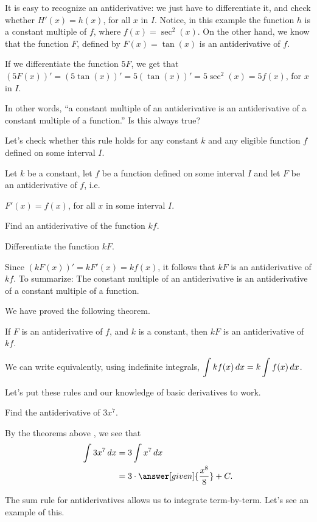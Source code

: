 \documentclass{ximera}
\begin{document}
It is easy to recognize an antiderivative: we just have to differentiate it, and check whether $H'(x)=h(x)$, for all $x$ in $I$.
Notice, in this example the function $h$ is a constant multiple of $f$, 
where $f(x)=\sec^{2}(x)$. On the other hand, we know that the function $F$, defined by
$F(x)=\tan(x)$ is an antiderivative of $f$.

If we  differentiate the function $5F$, we get that
$\left(5F(x)\right)'=\left(5\tan(x)\right)'=5\left(\tan(x)\right)'=5\sec^2(x)=5f(x)$, for $x$ in $I$.
  
  In other words, ``a constant multiple of an antiderivative is an antiderivative of a constant multiple of a function.''
Is this always true?

Let's check whether this rule holds for  any constant $k$ and any eligible  function $f$ defined on some interval $I$.

\begin{question}
Let $k$ be a constant, let $f$ be a function defined on some interval $I$ and let $F$ be an antiderivative of $f$, i.e.

$F'(x)=f(x)$, for all  $x$ in some interval $I$.

  Find an antiderivative of the function $k f$.
    \begin{hint}
    Differentiate the function $kF$.
     \end{hint}
     Since $\left(kF(x)\right)'=kF'(x)=kf(x)$, it follows that $kF$ is
     an antiderivative of $kf$.
 To summarize: The constant multiple of an antiderivative is an antiderivative of a constant multiple of a function. 
\end{question}
We have proved the following theorem.
\begin{theorem}\label{theorem:CMRA}
	If $F$ is an antiderivative of $f$, and $k$ is a constant, then $kF$ is an antiderivative of $kf$.

	We can write equivalently, using indefinite integrals,  $\displaystyle \int kf(x) \,d x= k\int f(x)\,d x$.
\end{theorem}
Let's put these rules and our knowledge of basic derivatives to work.
\begin{example}
Find the antiderivative of $3 x^7$.
\begin{explanation}
By the theorems above , we see that
\begin{align*}
\int 3 x^7 \d x &= 3 \int x^7 \d x\\
&= 3 \cdot \answer[given]{\frac{x^8}{8}}+C.
\end{align*}
\end{explanation}
\end{example}
The sum rule for antiderivatives allows us to integrate
term-by-term. Let's see an example of this.
\end{document}
